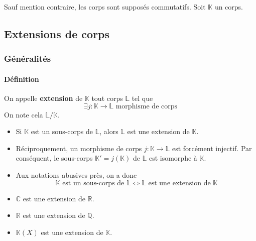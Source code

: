 




  Sauf mention contraire, les corps sont supposés commutatifs. Soit $\mathbb{K}$ un corps.

  \subsection{Extensions de corps}

  \subsubsection{Généralités}

  \paragraph{Définition}


  \begin{definition}
    On appelle \textbf{extension} de $\mathbb{K}$ tout corps $\mathbb{L}$ tel que
    \[ \exists j : \mathbb{K} \rightarrow \mathbb{L} \text{ morphisme de corps} \]
    On note cela $\mathbb{L}/\mathbb{K}$.
  \end{definition}

  \begin{remark}
    \begin{itemize}
      \item Si $\mathbb{K}$ est un sous-corps de $\mathbb{L}$, alors $\mathbb{L}$ est une extension de $\mathbb{K}$.
      \item Réciproquement, un morphisme de corps $j : \mathbb{K} \rightarrow \mathbb{L}$ est forcément injectif. Par conséquent, le sous-corps $\mathbb{K}' = j(\mathbb{K})$ de $\mathbb{L}$ est isomorphe à $\mathbb{K}$.
      \item Aux notations abusives près, on a donc
      \[ \mathbb{K} \text{ est un sous-corps de } \mathbb{L} \iff \mathbb{L} \text{ est une extension de } \mathbb{K} \]
    \end{itemize}
  \end{remark}

  \begin{example}
    \begin{itemize}
      \item $\mathbb{C}$ est une extension de $\mathbb{R}$.
      \item $\mathbb{R}$ est une extension de $\mathbb{Q}$.
      \item $\mathbb{K}(X)$ est une extension de $\mathbb{K}$.
    \end{itemize}
  \end{example}

